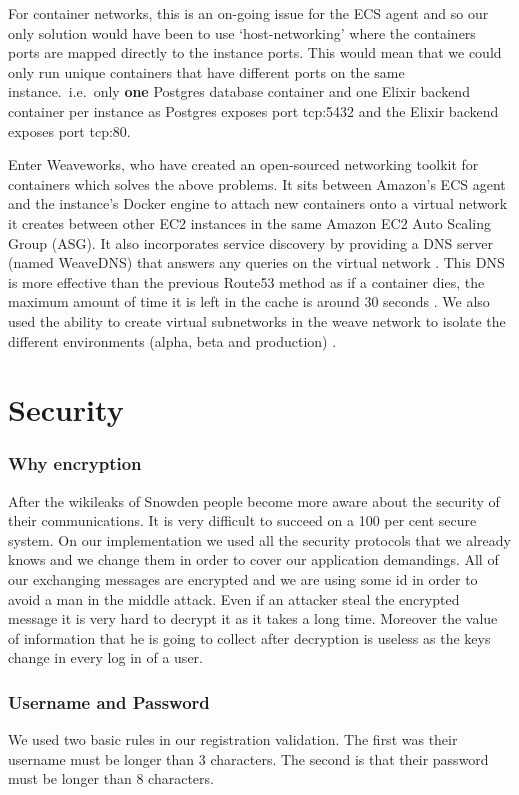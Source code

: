\documentclass[11pt,a4paper]{report}
\begin{document}
For container networks, this is an on-going issue for the ECS agent \cite{website:github_user_network_issue} and so our only solution would have been to use `host-networking' where the containers ports are mapped directly to the instance ports. This would mean that we could only run unique containers that have different ports on the same instance.\ i.e.\ only \textbf{one} Postgres database container and one Elixir backend container per instance as Postgres exposes port tcp:5432 and the Elixir backend exposes port tcp:80.

Enter Weaveworks, who have created an open-sourced networking toolkit for containers which solves the above problems. It sits between Amazon's ECS agent and the instance's Docker engine to attach new containers onto a virtual network it creates between other EC2 instances in the same Amazon EC2 Auto Scaling Group (ASG). It also incorporates service discovery by providing a DNS server (named WeaveDNS) that answers any queries on the virtual network \cite{website:weave_dns}. This DNS is more effective than the previous Route53 method as if a container dies, the maximum amount of time it is left in the cache is around 30 seconds \cite{website:weave_dns_fault_tolerance}. We also used the ability to create virtual subnetworks in the weave network to isolate the different environments (alpha, beta and production) \cite{website:weave_subnet_allocation}.


\section{Security}

\subsubsection{Why encryption}
After the wikileaks of Snowden people become more aware about the security of their communications. It is very difficult to succeed on a 100 per cent secure system. On our implementation we used all the security protocols that we already knows and we change them in order to cover our application demandings. All of our exchanging messages are encrypted and we are using some id in order to avoid a man in the middle attack. Even if an attacker steal the encrypted message it is very hard to decrypt it as it takes a long time. Moreover the value of information that he is going to collect after decryption is useless as the keys change in every log in of a user.

\subsubsection{Username and Password}
We used two basic rules in our registration validation. The first was their username must be longer than 3 characters. The second is that their password must be longer than 8 characters.
\end{document}
